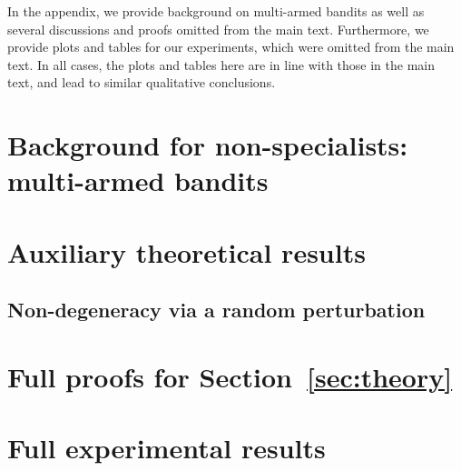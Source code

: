 \documentclass[11pt]{article}
\begin{document}












\newpage
\gaedit{

}

\newpage
{}


\begin{small}

\end{small}

\clearpage
\begin{appendices}

In the appendix, we provide background on multi-armed bandits as well as several discussions and proofs omitted from the main text. Furthermore, we provide plots and tables for our experiments, which were omitted from the main text. In all cases, the plots and tables here are in line with those in the main text, and lead to similar qualitative conclusions.

\section{Background for non-specialists: multi-armed bandits}
\label{sec:related-classes}


\section{Auxiliary theoretical results}
\label{app:examples}


\subsection{Non-degeneracy via a random perturbation}
\label{app:perturb}


\newpage
\section{Full proofs for Section~\ref{sec:theory}}
\label{sec:theory-proofs}


\newpage
\section{Full experimental results}
\label{app:expts}



%

\end{appendices}
\end{document}
